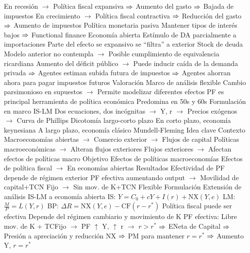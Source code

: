 \documentclass{nuevotema}
\begin{document}
\begin{esquemal}
				\4[] En recesión
				\4[] $\to$ Política fiscal expansiva
				\4[] $\Rightarrow$ Aumento del gasto
				\4[] $\Rightarrow$ Bajada de impuestos
				\4[] En crecimiento
				\4[] $\to$ Política fiscal contractiva
				\4[] $\Rightarrow$ Reducción del gasto
				\4[] $\Rightarrow$ Aumento de impuestos
				\4[] Política monetaria pasiva
				\4[] Mantener tipos de interés bajos
				\4[] $\Rightarrow$ Functional finance
				\4 Economía abierta
				\4[] Estímulo de DA parcialmente a importaciones
				\4[] Parte del efecto se expansivo se ``filtra'' a exterior
				\4 Stock de deuda
				\4[] Modelo anterior no contempla
				\4[] $\to$ Posible cumplimiento de equivalencia ricardiana
				\4[] Aumento del déficit público
				\4[] $\to$ Puede inducir caída de la demanda privada
				\4[] $\Rightarrow$ Agentes estiman subida futura de impuestos
				\4[] $\Rightarrow$ Agentes ahorran ahora para pagar impuestos futuros
			\3 Valoración
				\4 Marco de análisis flexible
				\4[] Cambio parsimonioso en supuestos
				\4[] $\to$ Permite modelizar diferentes efectos
				\4 PF es principal herramienta de política económica
				\4 Predomina en 50s y 60s
				\4 Formulación en marco IS-LM
				\4[] Dos ecuaciones, dos incógnitas
				\4[] $\to$ Y, r
				\4[] $\to$ Precios exógenos $\to$ Curva de Phillips
				\4 Dicotomía largo-corto plazo
				\4[] En corto plazo, economía keynesiana
				\4[] A largo plazo, economía clásico
		\2 Mundell-Fleming
			\3 Idea clave
				\4 Contexto
				\4[] Macroeconomías abiertas
				\4[] $\to$ Comercio exterior
				\4[] $\to$ Flujos de capital
				\4[] Políticas macroeconómicas
				\4[] $\to$ Alteran flujos exteriores
				\4[] Flujos exteriores
				\4[] $\to$ Afectan efectos de políticas macro
				\4 Objetivo
				\4[] Efectos de políticas macroeconomías
				\4[] Efectos de política fiscal
				\4[] $\to$ En economías abiertas
				\4 Resultados
				\4[] Efectividad de PF depende de régimen exterior
				\4[] PF efectiva aumentando output
				\4[] $\to$ Movilidad de capital+TCN Fijo
				\4[] $\to$ Sin mov. de K+TCN Flexible
			\3 Formulación
				\4 Extensión de análisis IS-LM a economía abierta
				\4[] IS: $Y = C_0 + cY + I(r) + \text{NX}(Y,e)$
				\4[] LM: $\frac{M}{P} = L(Y,r)$
				\4[] BP: $\Delta R = \text{NX} (Y,e) - \text{CF}(r-r^*)$
				\4 Política fiscal puede ser efectiva
				\4[] Depende del régimen cambiario y movimiento de K
				\4 PF efectiva: Libre mov. de K + TCFijo
				\4[] $\to$ PF $\uparrow$ Y, $\uparrow$ r
				\4[] $\to$ $r > r^*$ $\Rightarrow$ ENeta de Capital
				\4[] $\Rightarrow$ Presión a apreciación y reducción NX
				\4[] $\Rightarrow$ PM para mantener $r=r^*$
				\4[] $\Rightarrow$ Aumento Y, $r = r^*$

\end{esquemal}
\end{document}
